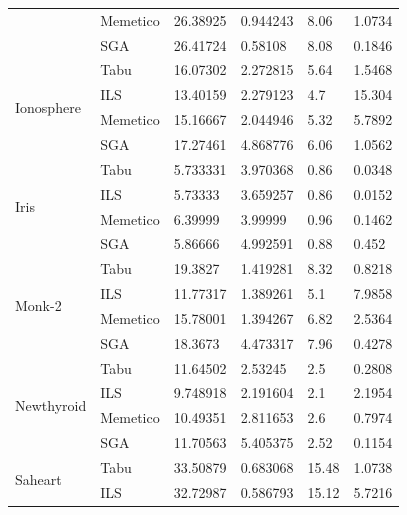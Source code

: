 \documentclass[11pt]{article}
\begin{document}
\begin{table}[h]
{\begin{tabular}{ |l|l|l|l|l|l| }
                                & Memetico & 26.38925   & 0.944243     &  8.06   & 1.0734 \\
                                & SGA      & 26.41724   & 0.58108      &  8.08   & 0.1846\\ \hline
    \multirow{4}{*}{Ionosphere}   & Tabu     & 16.07302   & 2.272815     &  5.64   & 1.5468 \\
                                  & ILS      & 13.40159   & 2.279123     &  4.7    & 15.304 \\
                                  & Memetico & 15.16667   & 2.044946     &  5.32   & 5.7892 \\
                                  & SGA      & 17.27461   & 4.868776     &  6.06   & 1.0562\\ \hline
    \multirow{4}{*}{Iris}   & Tabu     & 5.733331   & 3.970368     &  0.86   & 0.0348 \\
                            & ILS      & 5.73333    & 3.659257     &  0.86   & 0.0152 \\
                            & Memetico & 6.39999    & 3.99999      &  0.96   & 0.1462 \\
                            & SGA      & 5.86666    & 4.992591     &  0.88   & 0.452\\ \hline
    \multirow{4}{*}{Monk-2}   & Tabu     & 19.3827    & 1.419281     &  8.32   & 0.8218 \\
                              & ILS      & 11.77317   & 1.389261     &  5.1    & 7.9858 \\
                              & Memetico & 15.78001   & 1.394267     &  6.82   & 2.5364 \\
                              & SGA      & 18.3673    & 4.473317     &  7.96   & 0.4278\\ \hline
    \multirow{4}{*}{Newthyroid}   & Tabu     & 11.64502   & 2.53245      &  2.5    & 0.2808 \\
                                  & ILS      & 9.748918   & 2.191604     &  2.1    & 2.1954 \\
                                  & Memetico & 10.49351   & 2.811653     &  2.6    & 0.7974 \\
                                  & SGA      & 11.70563   & 5.405375     &  2.52   & 0.1154\\ \hline
    \multirow{4}{*}{Saheart}  & Tabu     & 33.50879   & 0.683068     &  15.48  & 1.0738 \\
                              & ILS      & 32.72987   & 0.586793     &  15.12  & 5.7216 \\

\end{tabular}}
\end{table}
\end{document}
